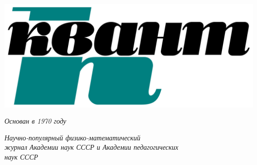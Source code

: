 \documentclass[10dd, a5paper]{article}
\newenvironment{Biglogo}
  {\par\medskip\noindent\minipage{\linewidth}}
  {\endminipage\par\vspace{1.5cm}}
\begin{document}
\pagestyle{fancy}
\fancyhf{}
\renewcommand{\headrulewidth}{0pt}
\fancyfoot[RO]{\textbf{\LARGE\thepage}}
\noindent

\begin{minipage}[t][][t]{0.45\linewidth}
\begin{Biglogo}
\raggedright
\includegraphics[width=0.7\linewidth]{Kvant_logo}

\smallskip
\fontsize{9dd}{7dd}\selectfont
\raggedright
\textit{Основан в 1970 году}
\end{Biglogo}
\fontsize{8dd}{7dd}\selectfont
\raggedright
\itshape Научно-популярный физико-математический\\ журнал Академии наук СССР и Академии педагогических\\ наук СССР


\end{minipage}
\end{document}
